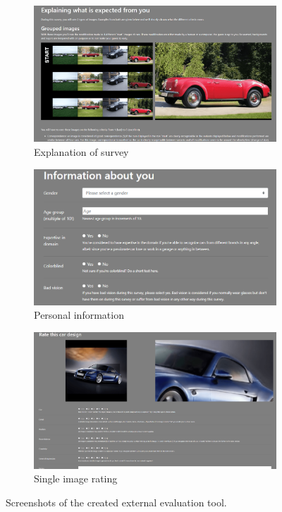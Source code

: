 \begin{figure}
\centering
\begin{subfigure}{.3\textwidth}
  \centering
  \includegraphics[width=\textwidth]{images/survey1.PNG}
  \caption{Explanation of survey}
  \label{fig:explain_survey}
\end{subfigure}%
\hspace{.02\textwidth}
\begin{subfigure}{.3\textwidth}
  \centering
  \includegraphics[width=\textwidth]{images/survey2.PNG}
  \caption{Personal information}
  \label{fig:personal_info_survey}
\end{subfigure}
\hspace{.02\textwidth}
\begin{subfigure}{.3\textwidth}
  \centering
  \includegraphics[width=\textwidth]{images/survey3.PNG}
  \caption{Single image rating}
  \label{fig:single_survey}
\end{subfigure}
\captionsetup{width=.85\linewidth}
\captionsetup{justification=centering}
\caption{Screenshots of the created external evaluation tool.}
\label{fig:survey}
\end{figure}


